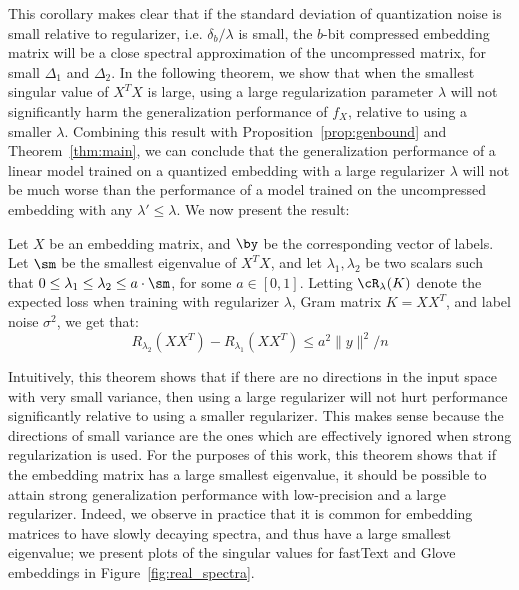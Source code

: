 This corollary makes clear that if the standard deviation of quantization noise is small relative to regularizer, i.e. $\delta_b/\lambda$ is small, the $b$-bit compressed embedding matrix will be a close spectral approximation of the uncompressed matrix, for small $\Delta_1$ and $\Delta_2$.
In the following theorem, we show that when the smallest singular value of $X^TX$ is large, using a large regularization parameter $\lambda$ will not significantly harm the generalization performance of $f_X$, relative to using a smaller $\lambda$.
Combining this result with Proposition~\ref{prop:genbound} and Theorem~\ref{thm:main}, we can conclude that the generalization performance of a linear model trained on a quantized embedding with a large regularizer $\lambda$ will not be much worse than the performance of a model trained on the uncompressed embedding with any $\lambda' \leq \lambda$.
We now present the result:

\begin{theorem}
	\label{thm:large_lambda}
	Let $X$ be an embedding matrix, and $\by$ be the corresponding vector of labels. Let $\sm$ be the smallest eigenvalue of $X^T X$, and let $\lambda_1, \lambda_2$ be two scalars such that $0 \leq \lambda_1 \leq \lambda_2 \leq a\cdot \sm$, for some $a \in [0,1]$. Letting $\cR_{\lambda}(K)$ denote the expected loss when training with regularizer $\lambda$, Gram matrix $K = XX^T$, and label noise $\sigma^2$, we get that:
	\begin{equation}
	R_{\lambda_2}(XX^T) - R_{\lambda_1}(XX^T) \leq a^2\|y\|^2/n
	\label{eq1}
	\end{equation}
\end{theorem}
Intuitively, this theorem shows that if there are no directions in the input space with very small variance, then using a large regularizer will not hurt performance significantly relative to using a smaller regularizer.
This makes sense because the directions of small variance are the ones which are effectively ignored when strong regularization is used.
For the purposes of this work, this theorem shows that if the embedding matrix has a large smallest eigenvalue, it should be possible to attain strong generalization performance with low-precision and a large regularizer.
Indeed, we observe in practice that it is common for embedding matrices to have slowly decaying spectra, and thus have a large smallest eigenvalue;
we present plots of the singular values for fastText and Glove embeddings in Figure~\ref{fig:real_spectra}. 

